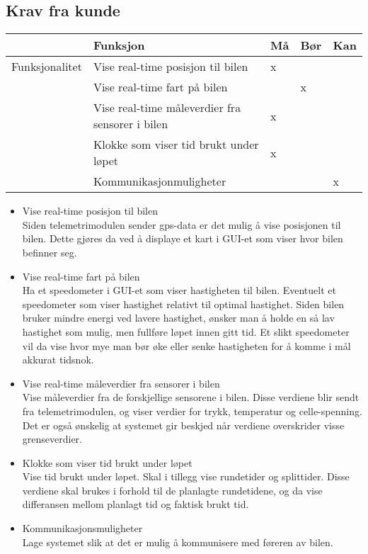\subsection{Krav fra kunde}
\begin{tabular}{|r|l|l|l|l|} 
\hline
 & \textbf{Funksjon} & \textbf{Må} & \textbf{Bør} & \textbf{Kan} \\ \hline
    \hline 
        Funksjonalitet  & Vise real-time posisjon til bilen & x &   & \\ \cline{2-5} 
                & Vise real-time fart på bilen &  & x  & \\ \cline{2-5} 
                & Vise real-time måleverdier fra sensorer i bilen & x &   & \\ \cline{2-5} 
                & Klokke som viser tid brukt under løpet   &  x &  & \\ \cline{2-5} 
                & Kommunikasjonmuligheter &  &   & x \\ \hline 
         \end{tabular}
\begin{itemize}
\item Vise real-time posisjon til bilen \\
Siden telemetrimodulen sender gps-data er det mulig  å vise posisjonen til bilen. Dette gjøres da ved å displaye et kart i GUI-et som viser hvor bilen befinner seg.
\item Vise real-time fart på bilen \\
Ha et speedometer i GUI-et som viser hastigheten til bilen. Eventuelt et speedometer som viser hastighet relativt til optimal hastighet. Siden bilen bruker mindre energi ved lavere hastighet, ønsker man å holde en så lav hastighet som mulig, men fullføre løpet innen gitt tid. Et slikt speedometer vil da vise hvor mye man bør øke eller senke hastigheten for å komme i mål akkurat tidsnok.
\item  Vise real-time måleverdier fra sensorer i bilen \\
Vise måleverdier fra de forskjellige sensorene i bilen. Disse verdiene blir sendt fra telemetrimodulen, og viser verdier for trykk, temperatur og celle-spenning. Det er også ønskelig at systemet gir beskjed når verdiene overskrider visse grenseverdier. 
\item Klokke som viser tid brukt under løpet \\
Vise tid brukt under løpet. Skal i tillegg vise rundetider og splittider. Disse verdiene skal brukes i forhold til de planlagte rundetidene, og da vise differansen mellom planlagt tid og faktisk brukt tid. 
\item Kommunikasjonsmuligheter \\
Lage systemet slik at det er mulig å kommunisere med føreren av bilen.
\end{itemize}
